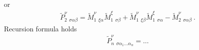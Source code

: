 \documentclass[letterpaper,10pt,english]{jupyterBook}
\begin{document}
\sphinxAtStartPar
or
\begin{equation*}
\begin{split}\widetilde{P}^{\nu}_{2\ \ \sigma \alpha \beta} = \widetilde{M}^{\nu}_{1 \ \ \xi \alpha} \widetilde{M}^{\xi}_{1 \ \ \sigma \beta} + \widetilde{M}^{\nu}_{1 \ \ \xi \beta} \widetilde{M}^{\xi}_{1 \ \ \sigma \alpha} - \widetilde{M}^{\nu}_{2 \ \ \sigma \alpha \beta} \ .\end{split}
\end{equation*}
\sphinxAtStartPar
{} Recursion formula holds
\begin{equation*}
\begin{split}\widetilde{P}^{\nu}_{n \ \ \sigma \alpha_1 \dots \alpha_n} = \dots\end{split}
\end{equation*}
\sphinxAtStartPar
{} 
\end{document}
